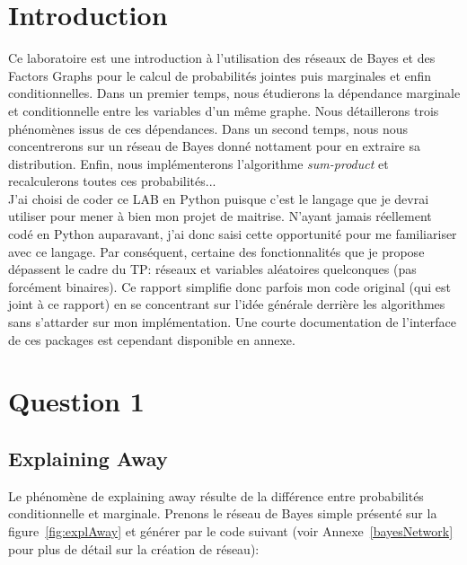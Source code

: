 \documentclass[11pt,letterpaper]{article}
\begin{document}
	
	\maketitlepage
	
\section{Introduction}


Ce laboratoire est une introduction à l'utilisation des réseaux de Bayes et des Factors Graphs pour le calcul de probabilités jointes puis marginales et enfin conditionnelles. Dans un premier temps, nous étudierons la dépendance marginale et conditionnelle entre les variables d'un même graphe. Nous détaillerons trois phénomènes issus de ces dépendances. Dans un second temps, nous nous concentrerons sur un réseau de Bayes donné nottament pour en extraire sa distribution. Enfin, nous implémenterons l'algorithme \emph{sum-product} et recalculerons toutes ces probabilités...\\


J'ai choisi de coder ce LAB en Python puisque c'est le langage que je devrai utiliser pour mener à bien mon projet de maitrise. N'ayant jamais réellement codé en Python auparavant, j'ai donc saisi cette opportunité pour me familiariser avec ce langage. Par conséquent, certaine des fonctionnalités que je propose dépassent le cadre du TP: réseaux et variables aléatoires quelconques (pas forcément binaires). Ce rapport simplifie donc parfois mon code original (qui est joint à ce rapport) en se concentrant sur l'idée générale derrière les algorithmes sans s'attarder sur mon implémentation. Une courte documentation de l'interface de ces packages est cependant disponible en annexe.

\section{Question 1}


\subsection*{Explaining Away}

Le phénomène de explaining away résulte de la différence entre probabilités conditionnelle et marginale. Prenons le réseau de Bayes simple présenté sur la figure~\ref{fig:explAway} et générer par le code suivant (voir Annexe~\ref{bayesNetwork} pour plus de détail sur la création de réseau):
\end{document}
